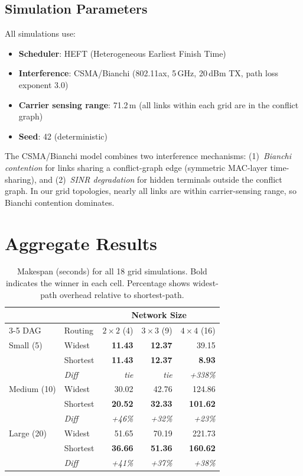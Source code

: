 \documentclass[11pt]{article}
\begin{document}
\subsection{Simulation Parameters}

All simulations use:
\begin{itemize}
    \item \textbf{Scheduler}: HEFT (Heterogeneous Earliest Finish Time)
    \item \textbf{Interference}: CSMA/Bianchi (802.11ax, 5\,GHz, 20\,dBm TX, path loss exponent 3.0)
    \item \textbf{Carrier sensing range}: 71.2\,m (all links within each grid are in the conflict graph)
    \item \textbf{Seed}: 42 (deterministic)
\end{itemize}

The CSMA/Bianchi model combines two interference mechanisms: (1)~\emph{Bianchi
contention} for links sharing a conflict-graph edge (symmetric MAC-layer
time-sharing), and (2)~\emph{SINR degradation} for hidden terminals outside
the conflict graph. In our grid topologies, nearly all links are within
carrier-sensing range, so Bianchi contention dominates.

\section{Aggregate Results}

\begin{table}[h]
\centering
\caption{Makespan (seconds) for all 18 grid simulations. Bold indicates the winner in each cell. Percentage shows widest-path overhead relative to shortest-path.}
\label{tab:results}
\begin{tabular}{ll rrr}
\toprule
& & \multicolumn{3}{c}{Network Size} \\
\cmidrule(lr){3-5}
DAG & Routing & $2\times2$ (4) & $3\times3$ (9) & $4\times4$ (16) \\
\midrule
Small (5)
  & Widest   & \textbf{11.43} & \textbf{12.37} & 39.15 \\
  & Shortest & \textbf{11.43} & \textbf{12.37} & \textbf{8.93} \\
  & \emph{Diff} & \emph{tie} & \emph{tie} & \emph{+338\%} \\
\midrule
Medium (10)
  & Widest   & 30.02          & 42.76          & 124.86 \\
  & Shortest & \textbf{20.52} & \textbf{32.33} & \textbf{101.62} \\
  & \emph{Diff} & \emph{+46\%} & \emph{+32\%} & \emph{+23\%} \\
\midrule
Large (20)
  & Widest   &  51.65         &  70.19         & 221.73 \\
  & Shortest & \textbf{36.66} & \textbf{51.36} & \textbf{160.62}  \\
  & \emph{Diff} & \emph{+41\%} & \emph{+37\%} & \emph{+38\%} \\
\bottomrule
\end{tabular}
\end{table}
\end{document}

